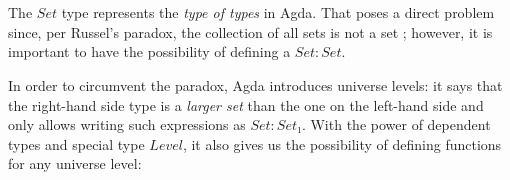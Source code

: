 {\begin{code}%
\>[0]\AgdaSpace{}%
\AgdaSpace{}%
\AgdaSymbol{(}\AgdaSpace{}%
\AgdaSymbol{:}\AgdaSpace{}%
\AgdaSymbol{)}\AgdaSpace{}%
\AgdaSymbol{:}\AgdaSpace{}%
\AgdaSpace{}%
\AgdaSpace{}%
\AgdaSpace{}%
\<%
\\
\>[0][@{}l@{\AgdaIndent{0}}]%
\>[2]\AgdaInductiveConstructor{[]}%
\>[6]\AgdaSymbol{:}\AgdaSpace{}%
\AgdaSpace{}%
\AgdaSpace{}%
\<%
\\
%
\>[2]\AgdaSpace{}%
\AgdaSymbol{:}\AgdaSpace{}%
\AgdaSymbol{\{}\AgdaSpace{}%
\AgdaSymbol{:}\AgdaSpace{}%
\AgdaSymbol{\}}\AgdaSpace{}%
\AgdaSpace{}%
\AgdaSpace{}%
\AgdaSpace{}%
\AgdaSpace{}%
\AgdaSpace{}%
\AgdaSpace{}%
\AgdaSpace{}%
\AgdaSpace{}%
\AgdaSpace{}%
\AgdaSymbol{(}\AgdaSpace{}%
\AgdaSymbol{)}\<%
\end{code}

The $Set$ type represents the \emph{type of types} in Agda. That poses a direct problem since, per Russel's paradox, the collection of all sets is not a set \cite{2019Official2.5.4.2}; however, it is important to have the possibility of defining a $Set : Set$.

In order to circumvent the paradox, Agda introduces universe levels: it says that the right-hand side type is a \emph{larger set} than the one on the left-hand side and only allows writing such expressions as $Set : Set₁$. With the power of dependent types and special type $Level$, it also gives us the possibility of defining functions for any universe level:

}
